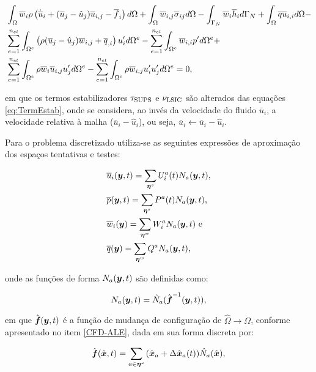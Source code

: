 \begin{equation}
    \begin{split}
        &\int_{\Omega}{\overline{w}_i\rho\left({\dot{\overline{u}}_i+(\overline{u}_j-\hat{u}_j)\overline{u}_{i,j}-\overline{f}_i}\right) d\Omega}+\int_{\Omega}{\overline{w}_{i,j}\overline{\sigma}_{ij} d\Omega}-\int_{\Gamma_N}{\overline{w}_i\overline{h}_i d\Gamma_N}+\int_{\Omega}{\overline{q}\overline{u}_{i,i} d\Omega}-\\
        &\sum_{e=1}^{n_{el}}{\int_{\Omega^e}{\left({\rho(\overline{u}_j-\hat{u}_j)\overline{w}_{i,j}+\overline{q}_{,i}}\right)u'_i d\Omega^e}}-\sum_{e=1}^{n_{el}}{\int_{\Omega^e}{\overline{w}_{i,i}p' d\Omega^e}}+\\
        &\sum_{e=1}^{n_{el}}{\int_{\Omega^e}{\rho\overline{w}_i\overline{u}_{i,j}u'_j d\Omega^e}}-\sum_{e=1}^{n_{el}}{\int_{\Omega^e}{\rho\overline{w}_{i,j}u'_iu'_j d\Omega^e}}=0
        \text{,}
        \label{eq:RBVMS-ALE}
    \end{split}
\end{equation}

\noindent em que os termos estabilizadores $\tau_{\mathrm{SUPS}}$ e $\nu_{\mathrm{LSIC}}$ são alterados das equações \ref{eq:TermEstab}, onde se considera, ao invés da velocidade do fluido $\bar{u}_i$, a velocidade relativa à malha ($\bar{u}_i-\hat{u}_i$), ou seja, $\bar{u}_i\gets\bar{u}_i-\hat{u}_i$.

Para o problema discretizado utiliza-se as seguintes expressões de aproximação dos espaços tentativas e testes:

\begin{subequations}
    \begin{align}
         & \overline{u}_i(\boldsymbol{y},t)=\sum_{\boldsymbol{\eta}^s}{U_i^a(t)N_a(\boldsymbol{y},t)}\text{,} \\
         & \overline{p}(\boldsymbol{y},t)=\sum_{\boldsymbol{\eta}^s}{P^a(t)N_a(\boldsymbol{y},t)}\text{,}     \\
         & \overline{w}_i(\boldsymbol{y})=\sum_{\boldsymbol{\eta}^w}{W_i^aN_a(\boldsymbol{y},t)}\text{ e}     \\
         & \overline{q}(\boldsymbol{y})=\sum_{\boldsymbol{\eta}^w}{Q^aN_a(\boldsymbol{y},t)}\text{,}
    \end{align}
\end{subequations}

\noindent onde as funções de forma $N_a(\boldsymbol{y},t)$ são definidas como:

\begin{equation}
    N_a(\boldsymbol{y},t)=\hat{N}_a(\hat{\boldsymbol{f}}^{-1}(\boldsymbol{y},t))\text{,}
\end{equation}

\noindent em que $\hat{\boldsymbol{f}}(\boldsymbol{y},t)$ é a função de mudança de configuração de $\hat{\Omega}\to\Omega$, conforme apresentado no item \ref{CFD-ALE}, dada em sua forma discreta por:

\begin{equation}
    \hat{\boldsymbol{f}}(\hat{\boldsymbol{x}},t)=\sum_{a\in\boldsymbol{\eta}^s}{(\hat{\boldsymbol{x}}_a+\Delta\hat{\boldsymbol{x}}_a(t))\hat{N}_a(\hat{\boldsymbol{x}})}\text{,}
\end{equation}

